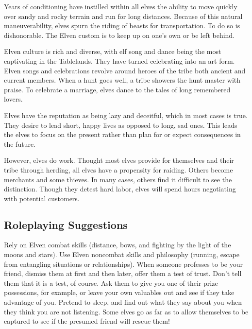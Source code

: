\documentclass[10pt,a4paper,twocolumn]{d20}
\begin{document}
Years of conditioning have instilled within all elves the ability to move quickly over sandy and rocky terrain and run for long distances. Because of this natural maneuverability, elves spurn the riding of beasts for transportation. To do so is dishonorable. The Elven custom is to keep up on one’s own or be left behind.

Elven culture is rich and diverse, with elf song and dance being the most captivating in the Tablelands. They have turned celebrating into an art form. Elven songs and celebrations revolve around heroes of the tribe both ancient and current members. When a hunt goes well, a tribe showers the hunt master with praise. To celebrate a marriage, elves dance to the tales of long remembered lovers.

Elves have the reputation as being lazy and deceitful, which in most cases is true. They desire to lead short, happy lives as opposed to long, sad ones. This leads the elves to focus on the present rather than plan for or expect consequences in the future.

However, elves do work. Thought most elves provide for themselves and their tribe through herding, all elves have a propensity for raiding. Others become merchants and some thieves. In many cases, others find it difficult to see the distinction. Though they detest hard labor, elves will spend hours negotiating with potential customers.

\subsection{Roleplaying Suggestions}
Rely on Elven combat skills (distance, bows, and fighting by the light of the moons and stars). Use Elven noncombat skills and philosophy (running, escape from entangling situations or relationships). When someone professes to be your friend, dismiss them at first and then later, offer them a test of trust. Don’t tell them that it is a test, of course. Ask them to give you one of their prize possessions, for example, or leave your own valuables out and see if they take advantage of you. Pretend to sleep, and find out what they say about you when they think you are not listening. Some elves go as far as to allow themselves to be captured to see if the presumed friend will rescue them!
\end{document}
